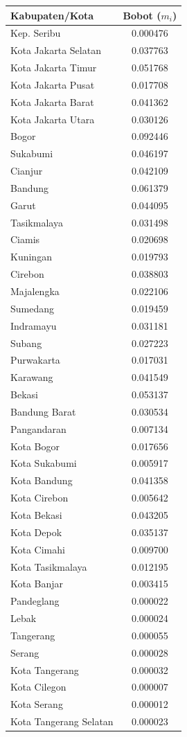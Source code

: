 \begin{longtable}{lc}
\hline
\textbf{Kabupaten/Kota} & \textbf{Bobot ($m_i$)} \\
\hline
Kep. Seribu & 0.000476 \\
\hline
Kota Jakarta Selatan & 0.037763 \\
\hline
Kota Jakarta Timur & 0.051768 \\
\hline
Kota Jakarta Pusat & 0.017708 \\
\hline
Kota Jakarta Barat & 0.041362 \\
\hline
Kota Jakarta Utara & 0.030126 \\
\hline
Bogor & 0.092446 \\
\hline
Sukabumi & 0.046197 \\
\hline
Cianjur & 0.042109 \\
\hline
Bandung & 0.061379 \\
\hline
Garut & 0.044095 \\
\hline
Tasikmalaya & 0.031498 \\
\hline
Ciamis & 0.020698 \\
\hline
Kuningan & 0.019793 \\
\hline
Cirebon & 0.038803 \\
\hline
Majalengka & 0.022106 \\
\hline
Sumedang & 0.019459 \\
\hline
Indramayu & 0.031181 \\
\hline
Subang & 0.027223 \\
\hline
Purwakarta & 0.017031 \\
\hline
Karawang & 0.041549 \\
\hline
Bekasi & 0.053137 \\
\hline
Bandung Barat & 0.030534 \\
\hline
Pangandaran & 0.007134 \\
\hline
Kota Bogor & 0.017656 \\
\hline
Kota Sukabumi & 0.005917 \\
\hline
Kota Bandung & 0.041358 \\
\hline
Kota Cirebon & 0.005642 \\
\hline
Kota Bekasi & 0.043205 \\
\hline
Kota Depok & 0.035137 \\
\hline
Kota Cimahi & 0.009700 \\
\hline
Kota Tasikmalaya & 0.012195 \\
\hline
Kota Banjar & 0.003415 \\
\hline
Pandeglang & 0.000022 \\
\hline
Lebak & 0.000024 \\
\hline
Tangerang & 0.000055 \\
\hline
Serang & 0.000028 \\
\hline
Kota Tangerang & 0.000032 \\
\hline
Kota Cilegon & 0.000007 \\
\hline
Kota Serang & 0.000012 \\
\hline
Kota Tangerang Selatan & 0.000023 \\
\hline
\end{longtable}
